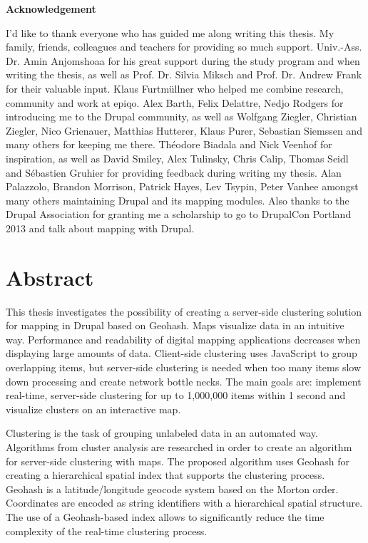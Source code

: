 
%
%

\textbf{Acknowledgement}

I'd like to thank everyone who has guided me along writing this thesis. My family, friends, colleagues and teachers for providing so much support. Univ.-Ass. Dr. Amin Anjomshoaa for his great support during the study program and when writing the thesis, as well as Prof. Dr. Silvia Miksch and Prof. Dr. Andrew Frank for their valuable input. Klaus Furtm\"{u}llner who helped me combine research, community and work at epiqo. Alex Barth, Felix Delattre, Nedjo Rodgers for introducing me to the Drupal community, as well as Wolfgang Ziegler, Christian Ziegler, Nico Grienauer, Matthias Hutterer, Klaus Purer, Sebastian Siemssen and many others for keeping me there. Th\'eodore Biadala and Nick Veenhof for inspiration, as well as David Smiley, Alex Tulinsky, Chris Calip, Thomas Seidl and S\'ebastien Gruhier for providing feedback during writing my thesis. Alan Palazzolo, Brandon Morrison, Patrick Hayes, Lev Tsypin, Peter Vanhee amongst many others maintaining Drupal and its mapping modules. Also thanks to the Drupal Association for granting me a scholarship to go to DrupalCon Portland 2013 and talk about mapping with Drupal. 


\chapter*{Abstract}

This thesis investigates the possibility of creating a server-side clustering solution for mapping in Drupal based on Geohash. Maps visualize data in an intuitive way. Performance and readability of digital mapping applications decreases when displaying large amounts of data. Client-side clustering uses JavaScript to group overlapping items, but server-side clustering is needed when too many items slow down processing and create network bottle necks. The main goals are: implement real-time, server-side clustering for up to 1,000,000 items within 1 second and visualize clusters on an interactive map.

Clustering is the task of grouping unlabeled data in an automated way. Algorithms from cluster analysis are researched in order to create an algorithm for server-side clustering with maps. The proposed algorithm uses Geohash for creating a hierarchical spatial index that supports the clustering process. Geohash is a latitude/longitude geocode system based on the Morton order. Coordinates are encoded as string identifiers with a hierarchical spatial structure. The use of a Geohash-based index allows to significantly reduce the time complexity of the real-time clustering process.

